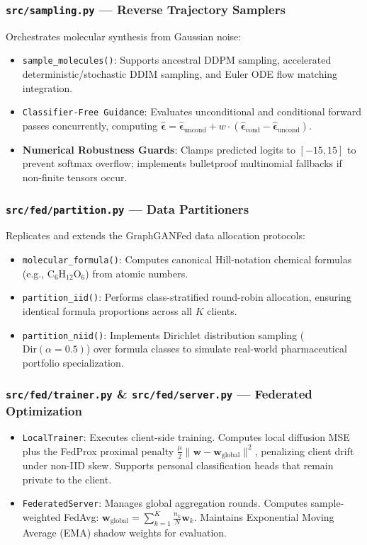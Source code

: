 \documentclass[12pt, a4paper]{article}
\begin{document}
\subsubsection{\texttt{src/sampling.py} --- Reverse Trajectory Samplers}
Orchestrates molecular synthesis from Gaussian noise:
\begin{itemize}[noitemsep]
    \item \texttt{sample\_molecules()}: Supports ancestral DDPM sampling, accelerated deterministic/stochastic DDIM sampling, and Euler ODE flow matching integration.
    \item \texttt{Classifier-Free Guidance}: Evaluates unconditional and conditional forward passes concurrently, computing $\hat{\boldsymbol{\epsilon}} = \hat{\boldsymbol{\epsilon}}_\text{uncond} + w \cdot (\hat{\boldsymbol{\epsilon}}_\text{cond} - \hat{\boldsymbol{\epsilon}}_\text{uncond})$.
    \item \textbf{Numerical Robustness Guards}: Clamps predicted logits to $[-15, 15]$ to prevent softmax overflow; implements bulletproof multinomial fallbacks if non-finite tensors occur.
\end{itemize}

\subsubsection{\texttt{src/fed/partition.py} --- Data Partitioners}
Replicates and extends the GraphGANFed data allocation protocols:
\begin{itemize}[noitemsep]
    \item \texttt{molecular\_formula()}: Computes canonical Hill-notation chemical formulas (e.g., $\text{C}_6\text{H}_{12}\text{O}_6$) from atomic numbers.
    \item \texttt{partition\_iid()}: Performs class-stratified round-robin allocation, ensuring identical formula proportions across all $K$ clients.
    \item \texttt{partition\_niid()}: Implements Dirichlet distribution sampling ($\text{Dir}(\alpha=0.5)$) over formula classes to simulate real-world pharmaceutical portfolio specialization.
\end{itemize}

\subsubsection{\texttt{src/fed/trainer.py} \& \texttt{src/fed/server.py} --- Federated Optimization}
\begin{itemize}[noitemsep]
    \item \texttt{LocalTrainer}: Executes client-side training. Computes local diffusion MSE plus the FedProx proximal penalty $\frac{\mu}{2} \|\mathbf{w} - \mathbf{w}_\text{global}\|^2$, penalizing client drift under non-IID skew. Supports personal classification heads that remain private to the client.
    \item \texttt{FederatedServer}: Manages global aggregation rounds. Computes sample-weighted FedAvg: $\mathbf{w}_\text{global} = \sum_{k=1}^K \frac{n_k}{N} \mathbf{w}_k$. Maintains Exponential Moving Average (EMA) shadow weights for evaluation.
\end{itemize}
\end{document}
